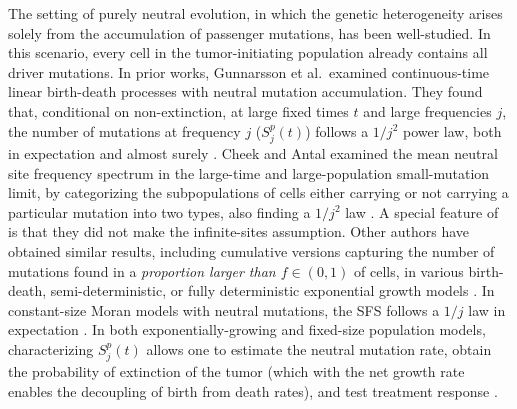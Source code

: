 \documentclass{article}
\numberwithin{equation}{section}
\begin{document}
The setting of purely neutral evolution, in which the genetic heterogeneity arises solely from the accumulation of passenger mutations, has been well-studied. In this scenario, every cell in the tumor-initiating population already contains all driver mutations.
In prior works, Gunnarsson et al.~examined continuous-time linear birth-death processes with neutral mutation accumulation. They found that, conditional on non-extinction, at large fixed times $t$ and large frequencies $j$, the number of mutations at frequency $j$ ($S_j^p(t)$) follows a $1/j^2$ power law, both in expectation and almost surely \cite{gunnarsson2021,gunnarsson2025}. Cheek and Antal examined the mean neutral site frequency spectrum in the large-time and large-population small-mutation limit, by categorizing the subpopulations of cells either carrying or not carrying a particular mutation into two types, also finding a $1/j^2$ law \cite{cheek2018}. A special feature of \cite{cheek2018} is that they did not make the infinite-sites assumption. Other authors have obtained similar results, including cumulative versions capturing the number of mutations found in a \textit{proportion larger than $f \in (0,1)$} of cells, in various birth-death, semi-deterministic, or fully deterministic exponential growth models \cite{durrett2013,bozic2016,williams2016,OHTSUKI201743}. In constant-size Moran models with neutral mutations, the SFS follows a $1/j$ law in expectation \cite{durrett_probability_2008}. In both exponentially-growing and fixed-size population models, characterizing $S_j^p(t)$ allows one to estimate the neutral mutation rate, obtain the probability of extinction of the tumor (which with the net growth rate enables the decoupling of birth from death rates), and test treatment response \cite{gunnarsson2021,gunnarsson2025,stein2025,durrett_probability_2008}.
\end{document}

